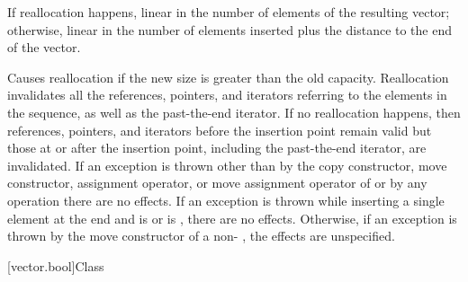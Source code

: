 \documentclass{wg21}
\begin{document}
\begin{itemdescr}
    \pnum
    \complexity
    If reallocation happens,
    linear in the number of elements of the resulting vector;
    otherwise,
    linear in the number of elements inserted plus the distance
    to the end of the vector.

    \pnum
    \remarks
    Causes reallocation if the new size is greater than the old capacity.
    Reallocation invalidates all the references, pointers, and iterators
    referring to the elements in the sequence, as well as the past-the-end iterator.
    If no reallocation happens, then
    references, pointers, and iterators
    before the insertion point remain valid
    but those at or after the insertion point,
    including the past-the-end iterator,
    are invalidated.
    If an exception is thrown other than by
    the copy constructor, move constructor,
    assignment operator, or move assignment operator of
     or by any  operation
    there are no effects.
    If an exception is thrown while inserting a single element at the end and
     is  or 
    is , there are no effects.
    Otherwise, if an exception is thrown by the move constructor of a non-
    , the effects are unspecified.
\end{itemdescr}

[vector.bool]{Class }

\pnum
{}%
\end{document}
